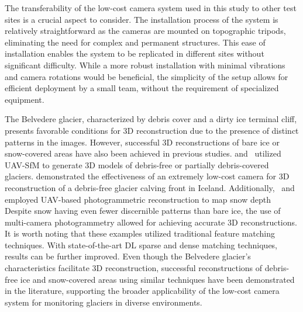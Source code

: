The transferability of the low-cost camera system used in this study to other test sites
is a crucial aspect to consider.
The installation process of the system is relatively straightforward as the cameras are
mounted on topographic tripods, eliminating the need for complex and permanent
structures.
This ease of installation enables the system to be replicated in different sites without
significant difficulty.
While a more robust installation with minimal vibrations and camera rotations would be
beneficial, the simplicity of the setup allows for efficient deployment by a small team,
without the requirement of specialized equipment.

The Belvedere glacier, characterized by debris cover and a dirty ice terminal cliff,
presents favorable conditions for 3D reconstruction due to the presence of distinct
patterns in the images.
However, successful 3D reconstructions of bare ice or snow-covered areas have also been
achieved in previous studies.
\citet{belloni2023} and~\citet{Gindraux2017} utilized UAV-SfM to generate 3D models
of debris-free or partially debris-covered glaciers.
\citet{Taylor2023} demonstrated the effectiveness of an extremely low-cost camera for 3D
reconstruction of a debris-free glacier calving front in Iceland.
Additionally,~\citet{Avanzi2018} and~\citet{DeMichele2016} employed UAV-based
photogrammetric reconstruction to map snow depth Despite snow having even fewer
discernible patterns than bare ice, the use of multi-camera photogrammetry allowed for
achieving accurate 3D reconstructions.
It is worth noting that these examples utilized traditional feature matching techniques.
With state-of-the-art DL sparse and dense matching techniques, results can be further
improved.
Even though the Belvedere glacier's characteristics facilitate 3D reconstruction,
successful reconstructions of debris-free ice and snow-covered areas using similar
techniques have been demonstrated in the literature, supporting the broader applicability
of the low-cost camera system for monitoring glaciers in diverse environments.

\makechapterbibliography{}

